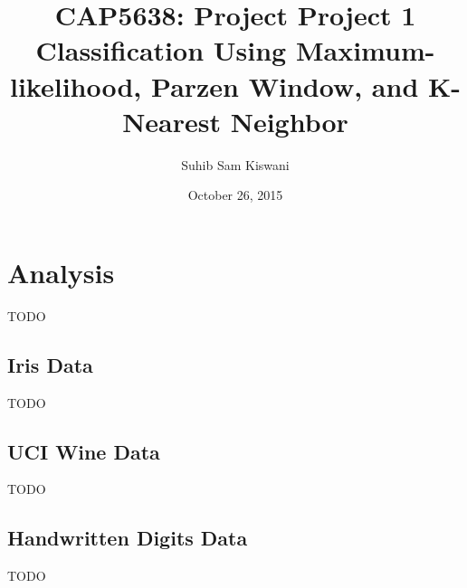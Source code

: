 \documentclass{article}
\title{
    CAP5638: Project Project 1 \\
    \large Classification Using Maximum-likelihood, Parzen Window, and K-Nearest Neighbor
}
\author{Suhib Sam Kiswani}
\date{October 26, 2015}
\newcommand{\todo}{
    {\Large TODO}
    \bigskip
}
\begin{document}
\maketitle

\section{Analysis}
\todo

\subsection{Iris Data}
\todo

\subsection{UCI Wine Data}
\todo

\subsection{Handwritten Digits Data}
\todo

\end{document}

